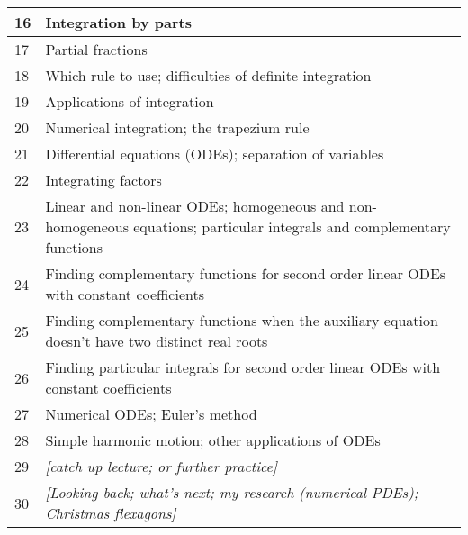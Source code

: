 \documentclass[11pt,a4paper,oneside]{book}
\begin{document}
\begin{tabular}{|p{}|p{}|}
  \hline
  16 & Integration by parts\\  \hline
  17 & Partial fractions\\  \hline
  18 & Which rule to use; difficulties of definite integration\\  \hline
  19 & Applications of integration\\  \hline
  20 & Numerical integration; the trapezium rule\\  \hline
  21 & Differential equations (ODEs); separation of variables\\  \hline
  22 & Integrating factors\\   \hline
  23 & Linear and non-linear ODEs; homogeneous and non-homogeneous equations; particular integrals and complementary functions\\  \hline
  24 & Finding complementary functions for second order linear ODEs with constant coefficients\\  \hline
  25 & Finding complementary functions when the auxiliary equation doesn't have two distinct real roots\\   \hline
  26 & Finding particular integrals for second order linear ODEs with constant coefficients\\  \hline
  27 & Numerical ODEs; Euler's method\\  \hline
  28 & Simple harmonic motion; other applications of ODEs\\  \hline
  29 & \textit{[catch up lecture; or further practice]}\\  \hline
  30 & \textit{[Looking back; what's next; my research (numerical PDEs); Christmas flexagons]}\\  \hline
\end{tabular}
\end{document}
